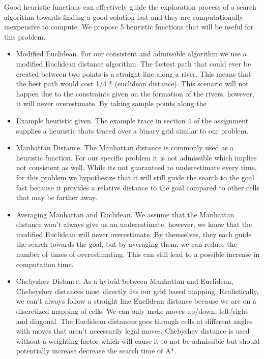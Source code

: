\documentclass[a4paper]{article}
\begin{document}
Good heuristic functions can effectively guide the exploration process of a search algorithm towards finding a good solution fast and they are computationally inexpensive to compute. We propose 5 heuristic functions that will be useful for this problem.
\begin{itemize}
  \item Modified Euclidean. For our consistent and admissible algorithm we use a modified Euclidean distance algorithm. The fastest path that could ever be created between two points is a straight line along a river. This means that the best path would cost 1/4 * (euclidean distance). This scenario will not happen due to the constraints given on the formation of the rivers, however, it will never overestimate. By taking sample points along the 
  \item Example heuristic given. The example trace in section 4 of the assignment supplies a heuristic thats traced over a binary grid similar to our problem. 
  \item Manhattan Distance. The Manhattan distance is commonly used as a heuristic function. For our specific problem it is not admissible which implies not consistent as well. While its not guaranteed to underestimate every time, for this problem we hypothesize that it will still guide the search to the goal fast because it provides a relative distance to the goal compared to other cells that may be farther away.
  \item Averaging Manhattan and Euclidean. We assume that the Manhattan distance won't always give us an underestimate, however, we know that the modified Euclidean will never overestimate. By themselves, they each guide the search towards the goal, but by averaging them, we can reduce the number of times of overestimating. This can still lead to a possible increase in computation time.
  \item Chebyshev Distance. As a hybrid between Manhattan and Euclidean, Chebsyshev distances most directly fits our grid based mapping. Realistically, we can't always follow a straight line Euclidean distance because we are on a discretized mapping of cells. We can only make moves up/down, left/right and diagonal. The Euclidean distances goes through cells at different angles with moves that aren't necessarily legal moves. Chebyshev distance is used without a weighting factor which will cause it to not be admissible but should potentially increase decrease the search time of A*.
\end{itemize}
\end{document}
